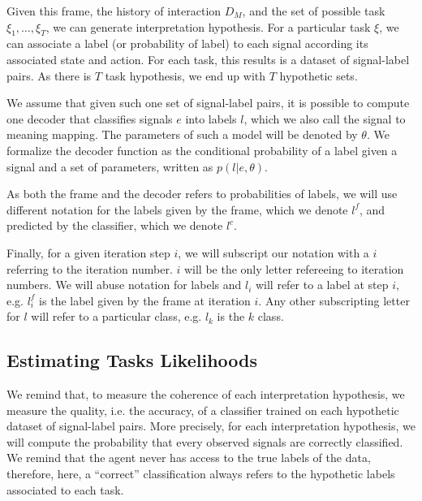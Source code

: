 Given this frame, the history of interaction $D_M$, and the set of possible task $\xi_1,\ldots,\xi_T$, we can generate interpretation hypothesis. For a particular task $\xi$, we can associate a label (or probability of label) to each signal according its associated state and action. For each task, this results is a dataset of signal-label pairs. As there is $T$ task hypothesis, we end up with $T$ hypothetic sets.

We assume that given such one set of signal-label pairs, it is possible to compute one decoder that classifies signals $e$ into labels $l$, which we also call the signal to meaning mapping. The parameters of such a model will be denoted by $\theta$. We formalize the decoder function as the conditional probability of a label given a signal and a set of parameters, written as $p(l|e,\theta)$.

As both the frame and the decoder refers to probabilities of labels, we will use different notation for the labels given by the frame, which we denote $l^f$, and predicted by the classifier, which we denote $l^c$. 

Finally, for a given iteration step $i$, we will subscript our notation with a $i$ referring to the iteration number. $i$ will be the only letter refereeing to iteration numbers. We will abuse notation for labels and $l_i$ will refer to a label at step $i$, e.g. $l^f_i$ is the label given by the frame at iteration $i$. Any other subscripting letter for $l$ will refer to a particular class, e.g. $l_k$ is the $k$ class.


\subsection{Estimating Tasks Likelihoods}
\label{chapter:lfui:likelihood}

We remind that, to measure the coherence of each interpretation hypothesis, we measure the quality, i.e. the accuracy, of a classifier trained on each hypothetic dataset of signal-label pairs. More precisely, for each interpretation hypothesis, we will compute the probability that every observed signals are correctly classified. We remind that the agent never has access to the true labels of the data, therefore, here, a ``correct'' classification always refers to the hypothetic labels associated to each task.

